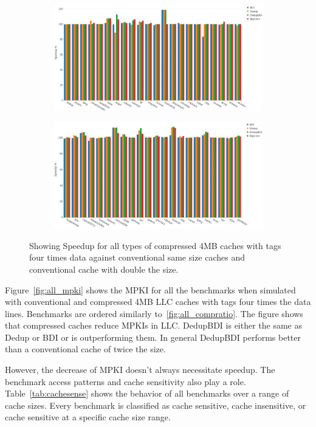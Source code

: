 \begin{figure}
    \begin{subfigure}{\textwidth}
        \includegraphics[width=\textwidth]{all4-speedup1.png}
    \end{subfigure}
    \begin{subfigure}{\textwidth}
        \includegraphics[width=\textwidth]{all4-speedup2.png}
    \end{subfigure}
    \caption[All benchmarks: 0.5MB Speedup]{Showing Speedup for all types of compressed 4MB caches with tags four times data against conventional same size caches and conventional cache with double the size.}
    \label{fig:all_speedup2}
\end{figure}
Figure~\ref{fig:all_mpki} shows the MPKI for all the benchmarks when simulated with conventional and compressed 4MB LLC caches with tags four times the data lines. Benchmarks are ordered similarly to~\ref{fig:all_compratio}. The figure shows that compressed caches reduce MPKIs in LLC. DedupBDI is either the same as Dedup or BDI or is outperforming them. In general DedupBDI performs better than a conventional cache of twice the size.\par
However, the decrease of MPKI doesn't always necessitate speedup. The benchmark access patterns and cache sensitivity also play a role. Table~\ref{tab:cachesense} shows the behavior of all benchmarks over a range of cache sizes. Every benchmark is classified as cache sensitive, cache insensitive, or cache sensitive at a specific cache size range.
